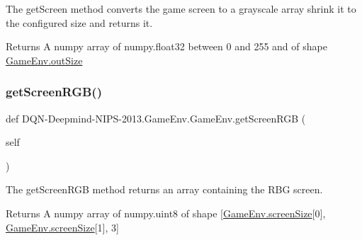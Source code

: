 The get\+Screen method converts the game screen to a grayscale array shrink it to the configured size and returns it. 

\begin{DoxyReturn}{Returns}
A numpy array of numpy.\+float32 between 0 and 255 and of shape \hyperlink{classDQN-Deepmind-NIPS-2013_1_1GameEnv_1_1GameEnv_ae8e7e56bd996ea0ce4ece1ca32f6b54a}{Game\+Env.\+out\+Size} 
\end{DoxyReturn}
\hypertarget{classDQN-Deepmind-NIPS-2013_1_1GameEnv_1_1GameEnv_a553c6eac3cac494bff5c9703dcfea2fe}{}\label{classDQN-Deepmind-NIPS-2013_1_1GameEnv_1_1GameEnv_a553c6eac3cac494bff5c9703dcfea2fe} 
\subsubsection{\texorpdfstring{get\+Screen\+R\+G\+B()}{getScreenRGB()}}
{\footnotesize\ttfamily def D\+QN-\/Deepmind-\/N\+I\+PS-\/2013.Game\+Env.\+Game\+Env.\+get\+Screen\+R\+GB (\begin{DoxyParamCaption}\item[{}]{self }\end{DoxyParamCaption})}



The get\+Screen\+R\+GB method returns an array containing the R\+BG screen. 

\begin{DoxyReturn}{Returns}
A numpy array of numpy.\+uint8 of shape \mbox{[}\hyperlink{classDQN-Deepmind-NIPS-2013_1_1GameEnv_1_1GameEnv_a2dedb2f4e5f0f1b7da2970ac89a5b544}{Game\+Env.\+screen\+Size}\mbox{[}0\mbox{]}, \hyperlink{classDQN-Deepmind-NIPS-2013_1_1GameEnv_1_1GameEnv_a2dedb2f4e5f0f1b7da2970ac89a5b544}{Game\+Env.\+screen\+Size}\mbox{[}1\mbox{]}, 3\mbox{]} 
\end{DoxyReturn}
\hypertarget{classDQN-Deepmind-NIPS-2013_1_1GameEnv_1_1GameEnv_ab2efa70a8316abde73936602001654a6}{}\label{classDQN-Deepmind-NIPS-2013_1_1GameEnv_1_1GameEnv_ab2efa70a8316abde73936602001654a6} 
